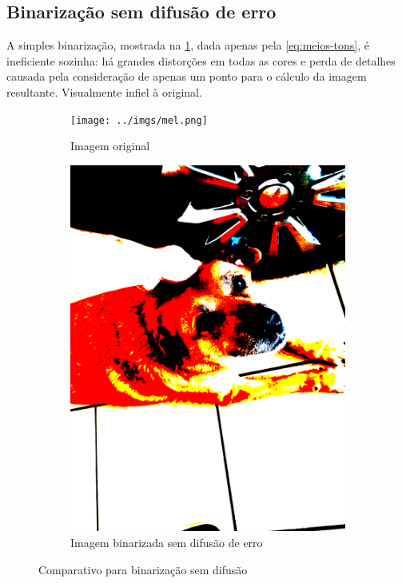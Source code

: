 \documentclass[brazilian,a4paper,twocolumn]{article}
\begin{document}
    \subsection{Binarização sem difusão de erro}

        A simples binarização, mostrada na \cref{fig:binarizada-sem_difusao}, dada apenas pela \cref{eq:meios-tons}, é ineficiente sozinha: há grandes distorções em todas as cores e perda de detalhes causada pela consideração de apenas um ponto para o cálculo da imagem resultante. Visualmente infiel à original.

        \begin{figure}
            \centering
            \begin{subfigure}{0.24\textwidth}
                \texttt{[image: ../imgs/mel.png]}
                \caption{Imagem original}
            \end{subfigure}
            \begin{subfigure}{0.24\textwidth}
                \includegraphics[width=\textwidth,keepaspectratio]{../imgs/mel-binarizada.png}
                \caption{Imagem binarizada sem difusão de erro}
            \end{subfigure}

            \caption{Comparativo para binarização sem difusão}
            \label{fig:binarizada-sem_difusao}
        \end{figure}
\end{document}
